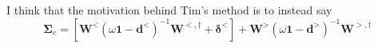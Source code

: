  I think that the motivation behind Tim's method is to instead say
\begin{equation}
    \bm{\Sigma} _c = \left[\bm{W}^< \left(\omega \bm{1} - \bm{d}^<\right)^{-1} \bm{W}^{<,\dagger} + \bm{\delta ^<} \right]+ \bm{W}^> \left(\omega \bm{1} - \bm{d}^>\right)^{-1} \bm{W}^{>,\dagger}
\end{equation}
